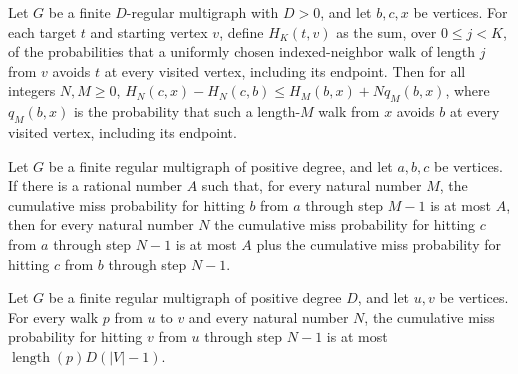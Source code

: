 \begin{theorem}
\label{Randomized.RegularMultigraph.hitTime_sub_le}
\leanok
{}
Let $G$ be a finite $D$-regular multigraph with $D>0$, and let $b,c,x$ be vertices. For
each target $t$ and starting vertex $v$, define $H_K(t,v)$ as the sum, over $0\le j<K$,
of the probabilities that a uniformly chosen indexed-neighbor walk of length $j$ from
$v$ avoids $t$ at every visited vertex, including its endpoint. Then for all integers
$N,M\ge0$, $H_N(c,x)-H_N(c,b)\le H_M(b,x)+Nq_M(b,x)$, where $q_M(b,x)$ is the
probability that such a length-$M$ walk from $x$ avoids $b$ at every visited vertex,
including its endpoint.
\end{theorem}

\begin{theorem}
\label{Randomized.RegularMultigraph.hitTime_le_add}
\leanok
{}
Let $G$ be a finite regular multigraph of positive degree, and let $a,b,c$ be vertices.
If there is a rational number $A$ such that, for every natural number $M$, the
cumulative miss probability for hitting $b$ from $a$ through step $M-1$ is at most $A$,
then for every natural number $N$ the cumulative miss probability for hitting $c$ from
$a$ through step $N-1$ is at most $A$ plus the cumulative miss probability for hitting
$c$ from $b$ through step $N-1$.
\end{theorem}

\begin{theorem}
\label{Randomized.RegularMultigraph.hitTime_le_length_mul}
\leanok
{}
Let $G$ be a finite regular multigraph of positive degree $D$, and let $u,v$ be
vertices. For every walk $p$ from $u$ to $v$ and every natural number $N$, the
cumulative miss probability for hitting $v$ from $u$ through step $N-1$ is at most
$\operatorname{length}(p)D(|V|-1)$.
\end{theorem}

